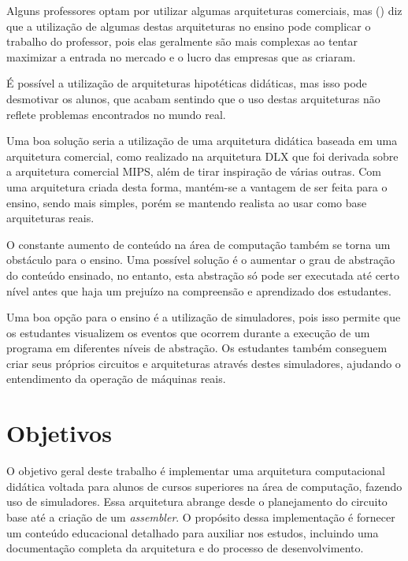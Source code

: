 \documentclass[
	12pt,				%
	openright,			%
	oneside,			%
	a4paper,			%
	english,			%
	french,				%
	spanish,			%
	brazil,				%
	]{abntex2}
\begin{document}
Alguns professores optam por utilizar algumas arquiteturas comerciais, mas (\citeyear{clements_arms_2010}) diz que a utilização de algumas destas arquiteturas no ensino pode complicar o trabalho do professor, pois elas geralmente são mais complexas ao tentar maximizar a entrada no mercado e o lucro das empresas que as criaram.

É possível a utilização de arquiteturas hipotéticas didáticas, mas isso pode desmotivar os alunos, que acabam sentindo que o uso destas arquiteturas não reflete problemas encontrados no mundo real. \cite{clements_arms_2010}

Uma boa solução seria a utilização de uma arquitetura didática baseada em uma arquitetura comercial, como realizado na arquitetura DLX \cite[p. 96-108]{patterson_computer_1996} que foi derivada sobre a arquitetura comercial MIPS, além de tirar inspiração de várias outras. Com uma arquitetura criada desta forma, mantém-se a vantagem de ser feita para o ensino, sendo mais simples, porém se mantendo realista ao usar como base arquiteturas reais.

O constante aumento de conteúdo na área de computação também se torna um obstáculo para o ensino. Uma possível solução é o aumentar o grau de abstração do conteúdo ensinado, no entanto, esta abstração só pode ser executada até certo nível antes que haja um prejuízo na compreensão e aprendizado dos estudantes. \cite[p.176]{wolffe_teaching_2002}

Uma boa opção para o ensino é a utilização de simuladores, pois isso permite que os estudantes visualizem os eventos que ocorrem durante a execução de um programa em diferentes níveis de abstração. Os estudantes também conseguem criar seus próprios circuitos e arquiteturas através destes simuladores, ajudando o entendimento da operação de máquinas reais.\cite[p.176-177]{wolffe_teaching_2002}

\section{Objetivos}\label{sec-objetivos}
O objetivo geral deste trabalho é implementar uma arquitetura computacional didática voltada para alunos de cursos superiores na área de computação, fazendo uso de simuladores. Essa arquitetura abrange desde o planejamento do circuito base até a criação de um \textit{assembler}. O propósito dessa implementação é fornecer um conteúdo educacional detalhado para auxiliar nos estudos, incluindo uma documentação completa da arquitetura e do processo de desenvolvimento.
\end{document}
